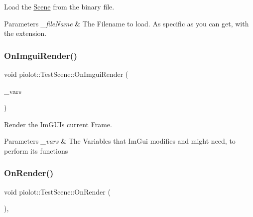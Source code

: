 Load the \mbox{\hyperlink{classpiolot_1_1_scene}{Scene}} from the binary file. 


\begin{DoxyParams}{Parameters}
{\em \+\_\+file\+Name} & The Filename to load. As specific as you can get, with the extension. \\
\hline
\end{DoxyParams}
\mbox{\label{classpiolot_1_1_test_scene_aa75a09c9c598fc35949f097cbb6df5cb}} 
\subsubsection{\texorpdfstring{On\+Imgui\+Render()}{OnImguiRender()}}
{\footnotesize\ttfamily void piolot\+::\+Test\+Scene\+::\+On\+Imgui\+Render (\begin{DoxyParamCaption}\item[{\mbox{\hyperlink{structpiolot_1_1_im_gui_control_variables}{Im\+Gui\+Control\+Variables}} \&}]{\+\_\+vars }\end{DoxyParamCaption})\hspace{0.3cm}{\ttfamily [virtual]}}



Render the Im\+G\+UI\textquotesingle{}s current Frame. 


\begin{DoxyParams}{Parameters}
{\em \+\_\+vars} & The Variables that Im\+Gui modifies and might need, to perform its functions \\
\hline
\end{DoxyParams}
\mbox{\label{classpiolot_1_1_test_scene_aeaccbb83f264fb4f1e8df5b246033f76}} 
\subsubsection{\texorpdfstring{On\+Render()}{OnRender()}}
{\footnotesize\ttfamily void piolot\+::\+Test\+Scene\+::\+On\+Render (\begin{DoxyParamCaption}{ }\end{DoxyParamCaption})\hspace{0.3cm}{\ttfamily [override]}, {\ttfamily [virtual]}}



